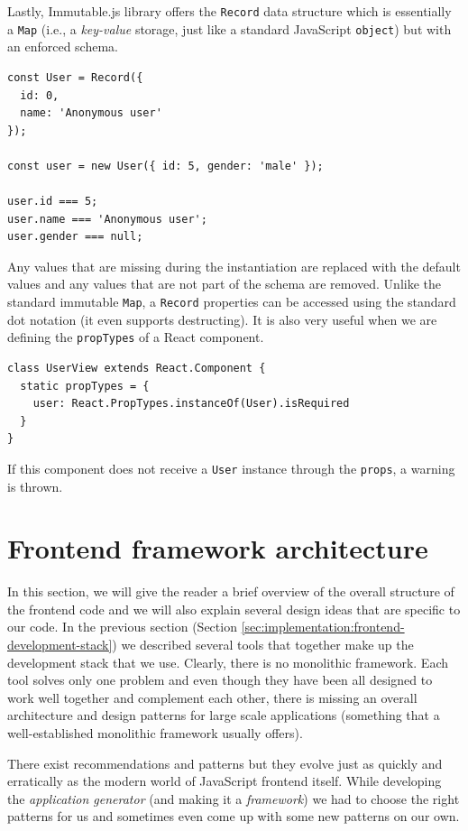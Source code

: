 Lastly, Immutable.js library offers the \texttt{Record} data structure which is essentially a \texttt{Map} (i.e., a \emph{key-value} storage, just like a standard JavaScript \texttt{object}) but with an enforced schema.

\begin{verbatim}
const User = Record({
  id: 0,
  name: 'Anonymous user'
});

const user = new User({ id: 5, gender: 'male' });

user.id === 5;
user.name === 'Anonymous user';
user.gender === null;
\end{verbatim}

Any values that are missing during the instantiation are replaced with the default values and any values that are not part of the schema are removed. Unlike the standard immutable \texttt{Map}, a \texttt{Record} properties can be accessed using the standard dot notation (it even supports destructing). It is also very useful when we are defining the \texttt{propTypes} of a React component.

\begin{verbatim}
class UserView extends React.Component {
  static propTypes = {
    user: React.PropTypes.instanceOf(User).isRequired
  }
}
\end{verbatim}

If this component does not receive a \texttt{User} instance through the \texttt{props}, a warning is thrown.

\section{Frontend framework architecture}

In this section, we will give the reader a brief overview of the  overall structure of the frontend code and we will also explain several design ideas that are specific to our code. In the previous section (Section \ref{sec:implementation:frontend-development-stack}) we described several tools that together make up the development stack that we use. Clearly, there is no monolithic framework. Each tool solves only one problem and even though they have been all designed to work well together and complement each other, there is missing an overall architecture and design patterns for large scale applications (something that a well-established monolithic framework usually offers).

There exist recommendations and patterns but they evolve just as quickly and erratically as the modern world of JavaScript frontend itself. While developing the \emph{application generator} (and making it a \emph{framework}) we had to choose the right patterns for us and sometimes even come up with some new patterns on our own.

